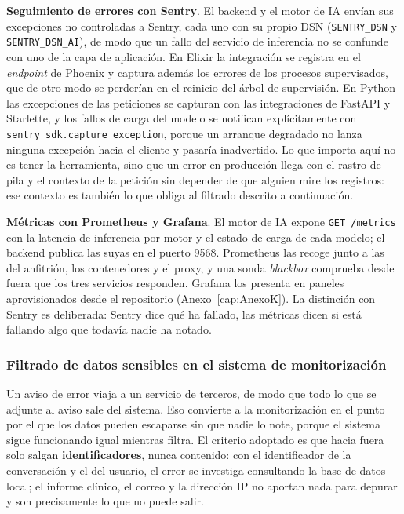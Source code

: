 \textbf{Seguimiento de errores con Sentry}. El backend y el motor de IA envían sus excepciones no controladas a Sentry, cada uno con su propio DSN (\texttt{SENTRY\_DSN} y \texttt{SENTRY\_DSN\_AI}), de modo que un fallo del servicio de inferencia no se confunde con uno de la capa de aplicación. En Elixir la integración se registra en el \emph{endpoint} de Phoenix y captura además los errores de los procesos supervisados, que de otro modo se perderían en el reinicio del árbol de supervisión. En Python las excepciones de las peticiones se capturan con las integraciones de FastAPI y Starlette, y los fallos de carga del modelo se notifican explícitamente con \texttt{sentry\_sdk.capture\_exception}, porque un arranque degradado no lanza ninguna excepción hacia el cliente y pasaría inadvertido. Lo que importa aquí no es tener la herramienta, sino que un error en producción llega con el rastro de pila y el contexto de la petición sin depender de que alguien mire los registros: ese contexto es también lo que obliga al filtrado descrito a continuación.

\textbf{Métricas con Prometheus y Grafana}. El motor de IA expone \texttt{GET /metrics} con la latencia de inferencia por motor y el estado de carga de cada modelo; el backend publica las suyas en el puerto 9568. Prometheus las recoge junto a las del anfitrión, los contenedores y el proxy, y una sonda \emph{blackbox} comprueba desde fuera que los tres servicios responden. Grafana los presenta en paneles aprovisionados desde el repositorio (Anexo~\ref{cap:AnexoK}). La distinción con Sentry es deliberada: Sentry dice qué ha fallado, las métricas dicen si está fallando algo que todavía nadie ha notado.

\subsubsection{Filtrado de datos sensibles en el sistema de monitorización}

Un aviso de error viaja a un servicio de terceros, de modo que todo lo que se adjunte al aviso sale del sistema. Eso convierte a la monitorización en el punto por el que los datos pueden escaparse sin que nadie lo note, porque el sistema sigue funcionando igual mientras filtra. El criterio adoptado es que hacia fuera solo salgan \textbf{identificadores}, nunca contenido: con el identificador de la conversación y el del usuario, el error se investiga consultando la base de datos local; el informe clínico, el correo y la dirección IP no aportan nada para depurar y son precisamente lo que no puede salir.

